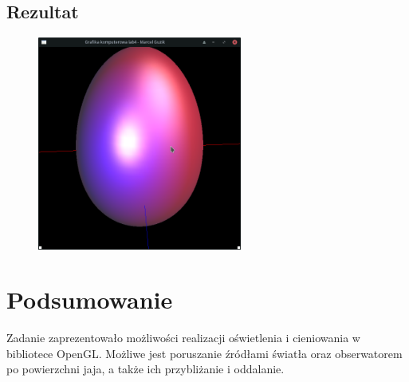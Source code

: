 \documentclass[a4paper]{article}
\begin{document}
\subsection{Rezultat}

\begin{figure}[H]
    \centering
    \includegraphics[width=0.6\textwidth]{result}
\end{figure}

\section{Podsumowanie}

Zadanie zaprezentowało możliwości realizacji oświetlenia i cieniowania w
bibliotece OpenGL. Możliwe jest poruszanie źródłami światła oraz obserwatorem po
powierzchni jaja, a także ich przybliżanie i oddalanie.
\end{document}
